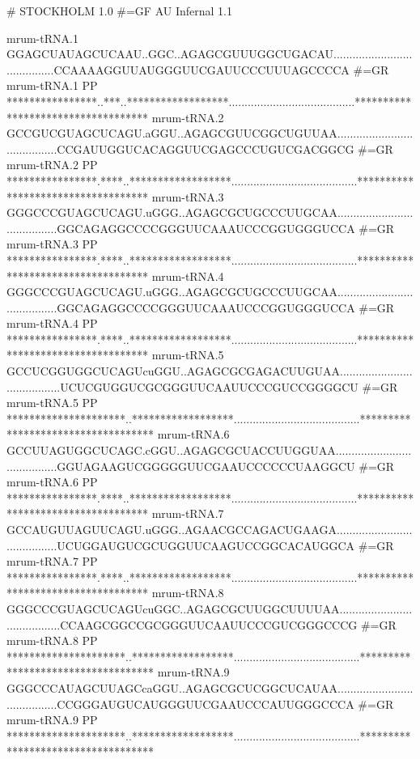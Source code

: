 \begin{sreoutput}
# STOCKHOLM 1.0
#=GF AU Infernal 1.1

mrum-tRNA.1          GGAGCUAUAGCUCAAU..GGC..AGAGCGUUUGGCUGACAU........................................CCAAAAGGUUAUGGGUUCGAUUCCCUUUAGCCCCA
#=GR mrum-tRNA.1  PP ****************..***..******************........................................***********************************
mrum-tRNA.2          GCCGUCGUAGCUCAGU.aGGU..AGAGCGUUCGGCUGUUAA........................................CCGAUUGGUCACAGGUUCGAGCCCUGUCGACGGCG
#=GR mrum-tRNA.2  PP ****************.****..******************........................................***********************************
mrum-tRNA.3          GGGCCCGUAGCUCAGU.uGGG..AGAGCGCUGCCCUUGCAA........................................GGCAGAGGCCCCGGGUUCAAAUCCCGGUGGGUCCA
#=GR mrum-tRNA.3  PP ****************.****..******************........................................***********************************
mrum-tRNA.4          GGGCCCGUAGCUCAGU.uGGG..AGAGCGCUGCCCUUGCAA........................................GGCAGAGGCCCCGGGUUCAAAUCCCGGUGGGUCCA
#=GR mrum-tRNA.4  PP ****************.****..******************........................................***********************************
mrum-tRNA.5          GCCUCGGUGGCUCAGUcuGGU..AGAGCGCGAGACUUGUAA........................................UCUCGUGGUCGCGGGUUCAAUUCCCGUCCGGGGCU
#=GR mrum-tRNA.5  PP *********************..******************........................................***********************************
mrum-tRNA.6          GCCUUAGUGGCUCAGC.cGGU..AGAGCGCUACCUUGGUAA........................................GGUAGAAGUCGGGGGUUCGAAUCCCCCCUAAGGCU
#=GR mrum-tRNA.6  PP ****************.****..******************........................................***********************************
mrum-tRNA.7          GCCAUGUUAGUUCAGU.uGGG..AGAACGCCAGACUGAAGA........................................UCUGGAUGUCGCUGGUUCAAGUCCGGCACAUGGCA
#=GR mrum-tRNA.7  PP ****************.****..******************........................................***********************************
mrum-tRNA.8          GGGCCCGUAGCUCAGUcuGGC..AGAGCGCUUGGCUUUUAA........................................CCAAGCGGCCGCGGGUUCAAUUCCCGUCGGGCCCG
#=GR mrum-tRNA.8  PP *********************..******************........................................***********************************
mrum-tRNA.9          GGGCCCAUAGCUUAGCcaGGU..AGAGCGCUCGGCUCAUAA........................................CCGGGAUGUCAUGGGUUCGAAUCCCAUUGGGCCCA
#=GR mrum-tRNA.9  PP *********************..******************........................................***********************************

\end{sreoutput}
